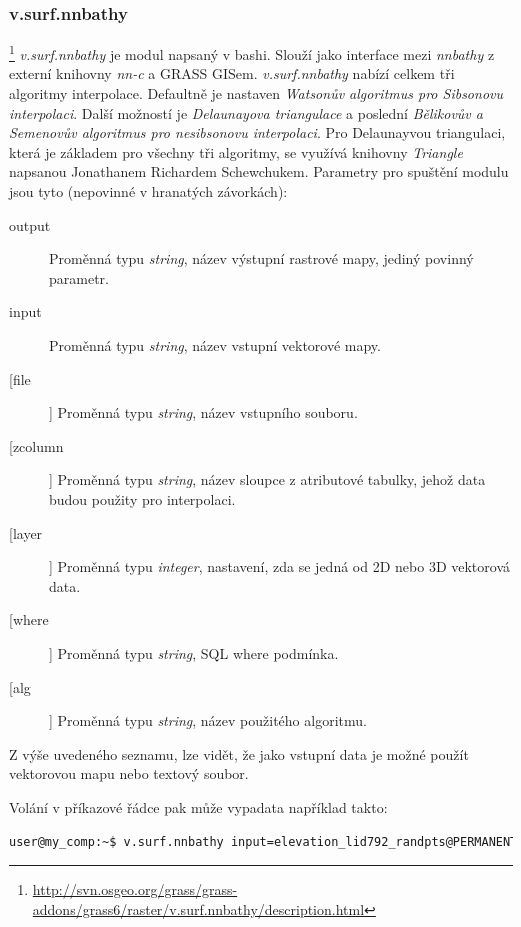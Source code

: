 \documentclass[12pt,a4paper]{article}
\begin{document}
\subsubsection{v.surf.nnbathy}\footnote{\url{http://svn.osgeo.org/grass/grass-addons/grass6/raster/v.surf.nnbathy/description.html}}
\textit{v.surf.nnbathy} je modul napsaný v bashi. Slouží jako interface mezi \textit{nnbathy} z externí knihovny \textit{nn-c} a GRASS GISem. \textit{v.surf.nnbathy} nabízí celkem tři algoritmy interpolace. Defaultně je nastaven \textit{Watsonův algoritmus 	pro Sibsonovu interpolaci}. Další možností je \textit{Delaunayova triangulace} a poslední \textit{Bělikovův a Semenovův algoritmus pro nesibsonovu interpolaci}. Pro Delaunayvou triangulaci, která je základem pro všechny tři algoritmy, se využívá knihovny \textit{Triangle} napsanou Jonathanem Richardem Schewchukem. Parametry pro spuštění modulu jsou tyto (nepovinné v hranatých závorkách):
\begin{description}
\item[output] Proměnná typu \textit{string}, název výstupní rastrové mapy, jediný povinný parametr.
\item[input] Proměnná typu \textit{string}, název vstupní vektorové mapy.
\item[[file]] Proměnná typu \textit{string}, název vstupního souboru.
\item[[zcolumn]] Proměnná typu \textit{string}, název sloupce z atributové tabulky, jehož data budou použity pro interpolaci.
\item[[layer]] Proměnná typu \textit{integer}, nastavení, zda se jedná od 2D nebo 3D vektorová data.
\item[[where]] Proměnná typu \textit{string}, SQL where podmínka.
\item[[alg]] Proměnná typu \textit{string}, název použitého algoritmu.
\end{description}

Z výše uvedeného seznamu, lze vidět, že jako vstupní data je možné použít vektorovou mapu nebo textový soubor.


Volání v příkazové řádce pak může vypadata například takto:
\begin{lstlisting}[language=bash,caption={bash version}]
user@my_comp:~$ v.surf.nnbathy input=elevation_lid792_randpts@PERMANENT output=raster_map zcolumn=value alg=nn
\end{lstlisting}
\end{document}
